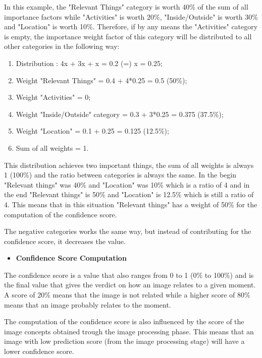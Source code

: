    In this example, the "Relevant Things" category is worth 40\% of the sum of all importance factors while "Activities" is worth 20\%, "Inside/Outside" is worth 30\% and "Location" is worth 10\%. Therefore, if by any means the "Activities" category is empty, the importance weight factor of this category will be distributed to all other categories in the following way:

   \begin{enumerate}
    \item Distribution : 4x + 3x + x = 0.2 (=) x = 0.25;
    \item Weight "Relevant Things" = 0.4 + 4*0.25 = 0.5 (50\%);
    \item Weight "Activities" = 0;
    \item Weight "Inside/Outside" category = 0.3 + 3*0.25 = 0.375 (37.5\%);
    \item Weight "Location" =  0.1 + 0.25 = 0.125 (12.5\%);
    \item Sum of all weights = 1.
   \end{enumerate}


   This distribution achieves two important things, the sum of all weights is always 1 (100\%) and the ratio between categories is always the same. In the begin "Relevant things" was 40\% and "Location" was 10\%  which is a ratio of 4 and in the end "Relevant things" is 50\% and "Location" is 12.5\% which is still a ratio of 4. This means that in this situation "Relevant things" has a weight of 50\% for the computation of the confidence score.
   
   The negative categories works the same way, but instead of contributing for the confidence score, it decreases the value.

    

    \begin{itemize}
      \item \textbf{Confidence Score Computation}
    \end{itemize}

    The confidence score is a value that also ranges from 0 to 1 (0\% to 100\%) and is the final value that gives the verdict on how an image relates to a given moment. A score of 20\% means that the image is not related while a higher score of 80\% means that an image probably relates to the moment. 

    The computation of the confidence score is also influenced by the score of the image concepts obtained trough the image processing phase. This means that an image with low prediction score (from the image processing stage) will have a lower confidence score. 

